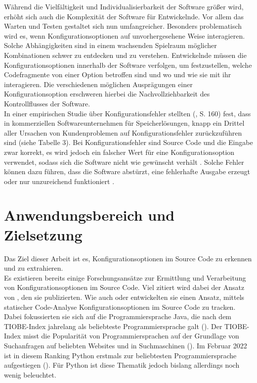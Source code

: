 \documentclass[german,bachelor]{swsLeipzig}
\begin{document}
W\"ahrend die Vielf\"altigkeit und Individualisierbarkeit der Software gr\"o\ss er wird, erh\"oht sich auch die Komplexit\"at der Software f\"ur Entwickelnde.
Vor allem das Warten und Testen gestaltet sich nun umfangreicher.
Besonders problematisch wird es, wenn Konfigurationsoptionen auf unvorhergesehene Weise interagieren.
Solche Abh\"angigkeiten sind in einem wachsenden Spielraum m\"oglicher Kombinationen schwer zu entdecken und zu verstehen.
Entwickelnde m\"ussen die Konfigurationsoptionen innerhalb der Software verfolgen, um festzustellen,
welche Codefragmente von einer Option betroffen sind und wo und wie sie mit ihr interagieren.
Die verschiedenen m\"oglichen Auspr\"agungen einer Konfigurationsoption erschweren hierbei die Nachvollziehbarkeit des Kontrollflusses der Software.\\

In einer empirischen Studie über Konfigurationsfehler stellten \citeauthor{10.1145/2043556.2043572} (\citeyear{10.1145/2043556.2043572}, S. 160)  fest,
dass in kommerziellen Softwareunternehmen für Speicherlösungen, knapp ein Drittel aller Ursachen von Kundenproblemen auf Konfigurationsfehler zurückzuführen sind (siehe Tabelle 3).
Bei Konfigurationsfehler sind Source Code und die Eingabe zwar korrekt, es wird jedoch ein falscher Wert für eine Konfigurationsoption verwendet,
sodass sich die Software nicht wie gewünscht verhält \cite[S. 152]{10.1145/2568225.2568251}. Solche Fehler können dazu führen, dass die Software abstürzt,
eine fehlerhafte Ausgabe erzeugt oder nur unzureichend funktioniert \cite[S. 152]{10.1145/2568225.2568251}.\\


\section{Anwendungsbereich und Zielsetzung}
Das Ziel dieser Arbeit ist es, Konfigurationsoptionen im Source Code zu erkennen und zu extrahieren. \\

Es existieren bereits einige Forschungsansätze zur Ermittlung und Verarbeitung von Konfigurationsoptionen im Source Code.
Viel zitiert wird dabei der Ansatz von \citeauthor{10.1145/1985793.1985812}, den sie \citeyear{10.1145/1985793.1985812} publizierten.
Wie auch \citeauthor{7774519} oder \citeauthor{8049300} entwickelten sie einen Ansatz, mittels statischer Code-Analyse Konfigurationsoptionen
im Source Code zu tracken.
Dabei fokussierten sie sich auf die Programmiersprache Java, die nach dem TIOBE-Index jahrelang als beliebteste Programmiersprache galt (\citeyear{enwiki:1077809155}).
Der TIOBE-Index misst die Popularität von Programmiersprachen auf der Grundlage von Suchanfragen auf beliebten Websites und in Suchmaschinen (\citeyear{enwiki:1077809155}).
Im Februar 2022 ist in diesem Ranking Python erstmals zur beliebtesten Programmiersprache aufgestiegen (\citeyear{enwiki:1077809155}).
Für Python ist diese Thematik jedoch bislang allerdings noch wenig beleuchtet. \\
\end{document}
